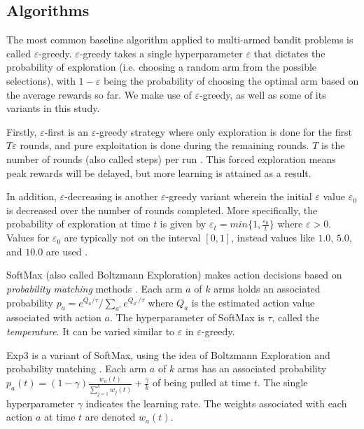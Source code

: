 \documentclass{article}
\begin{document}
\subsection{Algorithms} \label{sec:algos}

The most common baseline algorithm applied to multi-armed bandit problems is called $\varepsilon$-greedy. $\varepsilon$-greedy takes a single hyperparameter $\varepsilon$ 
that dictates the probability of exploration (i.e. choosing a random arm from the possible selections), with $1-\varepsilon$ being the probability of choosing the optimal 
arm based on the average rewards so far. We make use of $\varepsilon$-greedy, as well as some of its variants in this study. 

Firstly, $\varepsilon$-first is an $\varepsilon$-greedy strategy where only exploration is done for the first $T\varepsilon$ rounds, and pure exploitation 
is done during the remaining rounds. $T$ is the number of rounds (also called steps) per run \cite{mab_algos}. This forced exploration means peak rewards will be delayed, 
but more learning is attained as a result.

In addition, $\varepsilon$-decreasing is another $\varepsilon$-greedy variant wherein the initial $\varepsilon$ value $\varepsilon_0$ is decreased over the number of rounds 
completed. More specifically, the probability of exploration at time $t$ is given by $\varepsilon_t = min\{ 1, \frac{\varepsilon_0}{t}\}$ where $\varepsilon > 0$. Values for 
$\varepsilon_0$ are typically not on the interval $[0,1]$, instead values like $1.0$, $5.0$, and $10.0$ are used \cite{mab_algos}.

SoftMax (also called Boltzmann Exploration) makes action decisions based on \emph{probability matching} methods \cite{mab_algos}. Each arm $a$ of $k$ arms holds an associated 
probability $p_a = e^{Q_a/\tau}/\sum_{a'}e^{Q_{a'}/\tau}$ where $Q_a$ is the estimated action value associated with action $a$. The hyperparameter of SoftMax is $\tau$, called 
the \emph{temperature}. It can be varied similar to $\varepsilon$ in $\varepsilon$-greedy.

Exp3 is a variant of SoftMax, using the idea of Boltzmann Exploration and probability matching \cite{mab_algos}. Each arm $a$ of $k$ arms has an associated probability 
$p_a(t) = (1-\gamma) \frac{w_a(t)}{\sum_{j=1}^k w_j(t)} + \frac{\gamma}{k}$ of being pulled at time $t$. The single hyperparameter $\gamma$ indicates the learning 
rate. The weights associated with each action $a$ at time $t$ are denoted $w_a(t)$.
\end{document}
